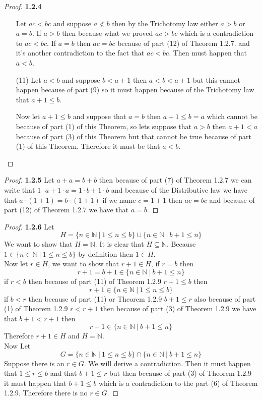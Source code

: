 \documentclass[11pt]{article}
\newcommand{\N}{\mathbb{N}}
\theoremstyle{definition}
\begin{document}
\begin{proof}{\textbf{1.2.4}}
\begin{itemize}
        Let $ac < bc$ and suppose $a\nless b$ then by the Trichotomy law either
        $a>b$ or $a=b$. If $a>b$ then because what we proved $ac>bc$ which is
        a contradiction to $ac < bc$. If $a = b$ then $ac = bc$ because of part
        (12) of Theorem 1.2.7. and it's another contradiction to the fact that
        $ac < bc$. Then must happen that $a<b$.
        \item [(11)] Let $a < b$ and suppose $b < a+1$ then $a < b < a + 1$ but
        this cannot happen because of part (9) so it must happen because of the
        Trichotomy law that $a + 1 \leq b$.

        Now let $a + 1 \leq b$ and suppose that $a = b$ then $a + 1 \leq b = a$
        which cannot be because of part (1) of this Theorem, so lets suppose
        that $a > b$ then $a + 1 < a$ because of part (3) of this Theorem but
        that cannot be true because of part (1) of this Theorem. Therefore
        it must be that $a < b$.
        \end{itemize}
    \end{proof}
    \begin{proof}{\textbf{1.2.5}}
        Let $a+a = b+b$ then because of part (7) of Theorem 1.2.7 we can write
        that $1\cdot a + 1 \cdot a = 1 \cdot b + 1 \cdot b$ and because of the
        Distributive law we have that $a\cdot (1 + 1) = b\cdot (1 + 1)$ if we
        name $c = 1 + 1$ then $ac=bc$ and because of part (12) of Theorem 1.2.7
        we have that $a = b$.
    \end{proof}
    \begin{proof}{\textbf{1.2.6}}
        Let
        $$H = \{n \in \N ~|~1 \leq n \leq b\} \cup\{n \in \N ~|~ b+1 \leq n\}$$
        We want to show that $H = \N$. It is clear that $H\subseteq\N$. Because
        $1 \in \{n \in \N ~|~1 \leq n \leq b\}$ by definition then $1 \in H$.\\
        Now let $r \in H$, we want to show that $r+1 \in H$, if $r=b$ then
        $$r+1=b+1 \in \{n \in \N ~|~ b+1 \leq n\}$$
        if $r < b$ then because of part (11) of Theorem 1.2.9 $r+1 \leq b$ then
        $$r+1 \in \{n \in \N ~|~1 \leq n \leq b\}$$
        if $b < r$ then because of part (11) or Theorem 1.2.9 $b+1 \leq r$
        also because of part (1) of Theorem 1.2.9 $r < r+1$ then because
        of part (3) of Theorem 1.2.9 we have that $b+1 < r+1$ then
        $$r+1 \in \{n \in \N ~|~ b+1 \leq n\}$$
        Therefore $r+1 \in H$ and $H = \N$.\\
        Now Let
        $$G = \{n \in \N ~|~1 \leq n \leq b\} \cap\{n \in \N ~|~ b+1 \leq n\}$$
        Suppose there is an $r\in G$. We will derive a contradiction.
        Then it must happen that $1\leq r \leq b$ and that $b +1 \leq r$ but
        then because of part (3) of Theorem 1.2.9 it must happen that 
        $b+1 \leq b$ which is a contradiction to the part (6) of Theorem 1.2.9.
        Therefore there is no $r \in G$.
    \end{proof}
\end{document}
